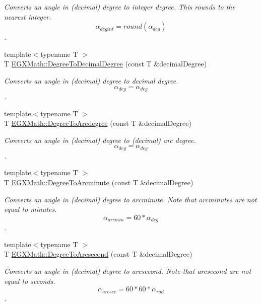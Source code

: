 \begin{DoxyCompactItemize}
\begin{DoxyCompactList}\small\item\em Converts an angle in (decimal) degree to integer degree. This rounds to the nearest integer. \[\alpha_{deg int}=round(\alpha_{deg})\]. \end{DoxyCompactList}\item 
{\footnotesize template$<$typename T $>$ }\\T \mbox{\hyperlink{group___e_g_x_math-_angle_conversions-_degree_ga568afc1d436d425bf5d4edea584aee08}{E\+G\+X\+Math\+::\+Degree\+To\+Decimal\+Degree}} (const T \&decimal\+Degree)
\begin{DoxyCompactList}\small\item\em Converts an angle in (decimal) degree to decimal degree. \[\alpha_{deg}=\alpha_{deg}\]. \end{DoxyCompactList}\item 
{\footnotesize template$<$typename T $>$ }\\T \mbox{\hyperlink{group___e_g_x_math-_angle_conversions-_degree_gac1b5f3b68f66c77a6df4ceef842c9b19}{E\+G\+X\+Math\+::\+Degree\+To\+Arcdegree}} (const T \&decimal\+Degree)
\begin{DoxyCompactList}\small\item\em Converts an angle in (decimal) degree to (decimal) arc degree. \[\alpha_{deg}=\alpha_{deg}\]. \end{DoxyCompactList}\item 
{\footnotesize template$<$typename T $>$ }\\T \mbox{\hyperlink{group___e_g_x_math-_angle_conversions-_degree_ga8abf327dc5f52907b2c881999e9cc43e}{E\+G\+X\+Math\+::\+Degree\+To\+Arcminute}} (const T \&decimal\+Degree)
\begin{DoxyCompactList}\small\item\em Converts an angle in (decimal) degree to arcminute. Note that arcminutes are not equal to minutes. \[\alpha_{arcmin}= 60 * \alpha_{deg}\]. \end{DoxyCompactList}\item 
{\footnotesize template$<$typename T $>$ }\\T \mbox{\hyperlink{group___e_g_x_math-_angle_conversions-_degree_gaf85e2d765c248f447854a807a68a5de8}{E\+G\+X\+Math\+::\+Degree\+To\+Arcsecond}} (const T \&decimal\+Degree)
\begin{DoxyCompactList}\small\item\em Converts an angle in (decimal) degree to arcsecond. Note that arcsecond are not equal to seconds. \[\alpha_{arcsec}=60 * 60 * \alpha_{rad}\]. \end{DoxyCompactList}\item 

\end{DoxyCompactItemize}
